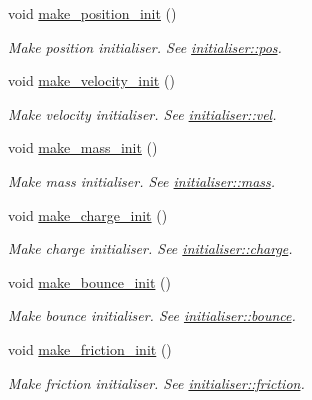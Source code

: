 \begin{DoxyCompactItemize}
void \hyperlink{classphysim_1_1init_1_1multisource_a41bf00a8e0b8b60d7ca86dc9dd00c0db}{make\+\_\+position\+\_\+init} ()
\begin{DoxyCompactList}\small\item\em Make position initialiser. See \hyperlink{classphysim_1_1init_1_1initialiser_a1980105ffaa655858b90a8f3a9368682}{initialiser\+::pos}. \end{DoxyCompactList}\item 
void \hyperlink{classphysim_1_1init_1_1multisource_a9bd421ceff83a6989e071cb0eebcae77}{make\+\_\+velocity\+\_\+init} ()
\begin{DoxyCompactList}\small\item\em Make velocity initialiser. See \hyperlink{classphysim_1_1init_1_1initialiser_a0e6b1de60df484977b975369b225e89b}{initialiser\+::vel}. \end{DoxyCompactList}\item 
void \hyperlink{classphysim_1_1init_1_1multisource_a6fe9dabcfe734fb68611d71de90157bb}{make\+\_\+mass\+\_\+init} ()
\begin{DoxyCompactList}\small\item\em Make mass initialiser. See \hyperlink{classphysim_1_1init_1_1initialiser_aaf4931c0b596b54097c43d9439d03edc}{initialiser\+::mass}. \end{DoxyCompactList}\item 
void \hyperlink{classphysim_1_1init_1_1multisource_a9118fc38926eab79955cb02a8b27284f}{make\+\_\+charge\+\_\+init} ()
\begin{DoxyCompactList}\small\item\em Make charge initialiser. See \hyperlink{classphysim_1_1init_1_1initialiser_ac9ff9d82f6a1effdaf44cfacd92669d6}{initialiser\+::charge}. \end{DoxyCompactList}\item 
void \hyperlink{classphysim_1_1init_1_1multisource_ad994252de40d3c0affb068cc2f2d645e}{make\+\_\+bounce\+\_\+init} ()
\begin{DoxyCompactList}\small\item\em Make bounce initialiser. See \hyperlink{classphysim_1_1init_1_1initialiser_ad8917d57b62f13ffb6cff24d39b4d360}{initialiser\+::bounce}. \end{DoxyCompactList}\item 
void \hyperlink{classphysim_1_1init_1_1multisource_a18db2f8c43641a9ec243ba0a4693f679}{make\+\_\+friction\+\_\+init} ()
\begin{DoxyCompactList}\small\item\em Make friction initialiser. See \hyperlink{classphysim_1_1init_1_1initialiser_a47fdfedccb1be510ee3021749dfe06e6}{initialiser\+::friction}. \end{DoxyCompactList}\item 

\end{DoxyCompactItemize}
